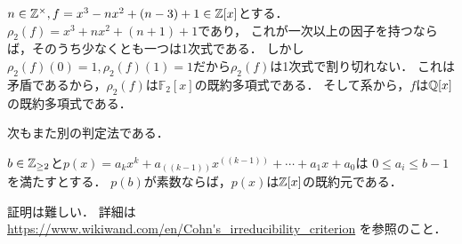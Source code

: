 \documentclass[a4j]{jsarticle}
\begin{document}
\begin{Example}
    $n \in \mathbb{Z}^{\times}, f=x^3-nx^2+(n-3)+1 \in \mathbb{Z}[x]$とする．
    $\rho_2(f)=x^3+nx^2+(n+1)+1 $であり，
    これが一次以上の因子を持つならば，そのうち少なくとも一つは1次式である．
    しかし$\rho_2(f)(0)=1, \rho_2(f)(1)=1$だから$\rho_2(f)$は1次式で割り切れない．
    これは矛盾であるから，$\rho_2(f)$は$\mathbb{F}_2[x]$の既約多項式である．
    そして系から，$f$は$\mathbb{Q}[x]$の既約多項式である．
\end{Example}

次もまた別の判定法である．
\begin{Them}
    $b \in \mathbb{Z}_{\geq 2}$と$p(x)=a_{k}x^{k}+a_((k-1))x^((k-1))+\cdots +a_{1}x+a_{0}$は
    $0 \leq a_{i}\leq b-1$を満たすとする．
    $p(b)$が素数ならば，$p(x)$は$\mathbb{Z}[x]$の既約元である．
\end{Them}
証明は難しい．
詳細は\url{https://www.wikiwand.com/en/Cohn's_irreducibility_criterion} を参照のこと．
\end{document}
